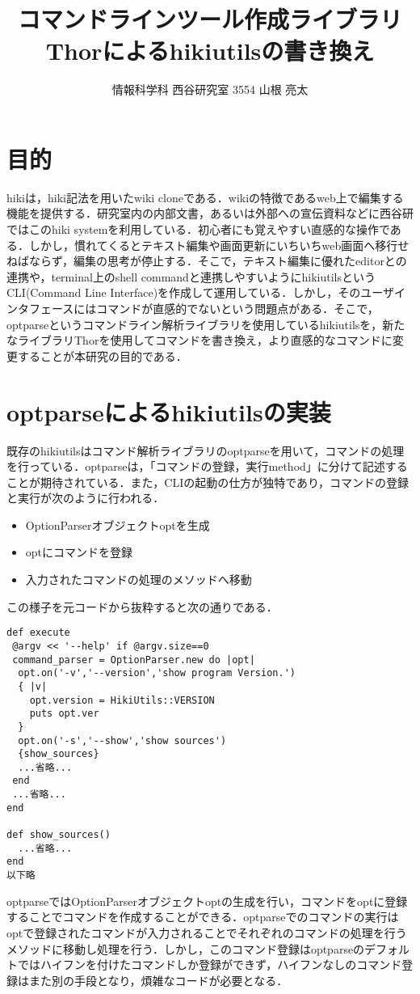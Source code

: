 \documentclass[a4j,twocolumn]{jsarticle}
\begin{document}
\title{コマンドラインツール作成ライブラリThorによるhikiutilsの書き換え}
\author{情報科学科 西谷研究室 3554 山根 亮太}
\date{}
\maketitle
\section{目的}
hikiは，hiki記法を用いたwiki cloneである．wikiの特徴であるweb上で編集する機能を提供する．研究室内の内部文書，あるいは外部への宣伝資料などに西谷研ではこのhiki systemを利用している．初心者にも覚えやすい直感的な操作である．しかし，慣れてくるとテキスト編集や画面更新にいちいちweb画面へ移行せねばならず，編集の思考が停止する．そこで，テキスト編集に優れたeditorとの連携や，terminal上のshell commandと連携しやすいようにhikiutilsというCLI(Command Line Interface)を作成して運用している\cite{hikiutils}．しかし，そのユーザインタフェースにはコマンドが直感的でないという問題点がある．そこで，optparse\cite{optparse}というコマンドライン解析ライブラリを使用しているhikiutilsを，新たなライブラリThor\cite{thor}を使用してコマンドを書き換え，より直感的なコマンドに変更することが本研究の目的である．

\section{optparseによるhikiutilsの実装}
既存のhikiutilsはコマンド解析ライブラリのoptparseを用いて，コマンドの処理を行っている．optparseは，「コマンドの登録，実行method」に分けて記述することが期待されている．また，CLIの起動の仕方が独特であり，コマンドの登録と実行が次のように行われる．
\begin{itemize}
\item OptionParserオブジェクトoptを生成
\item optにコマンドを登録
\item 入力されたコマンドの処理のメソッドへ移動
\end{itemize}

この様子を元コードから抜粋すると次の通りである．

\begin{lstlisting}[style=customRuby,basicstyle={\scriptsize\ttfamily}]
def execute
 @argv << '--help' if @argv.size==0
 command_parser = OptionParser.new do |opt|
  opt.on('-v','--version','show program Version.') 
  { |v|
    opt.version = HikiUtils::VERSION
    puts opt.ver
  }
  opt.on('-s','--show','show sources')
  {show_sources}                
  ...省略...
 end
 ...省略...
end     
  
def show_sources()
  ...省略...
end
以下略
\end{lstlisting}
optparseではOptionParserオブジェクトoptの生成を行い，コマンドをoptに登録することでコマンドを作成することができる．optparseでのコマンドの実行はoptで登録されたコマンドが入力されることでそれぞれのコマンドの処理を行うメソッドに移動し処理を行う．しかし，このコマンド登録はoptparseのデフォルトではハイフンを付けたコマンドしか登録ができず，ハイフンなしのコマンド登録はまた別の手段となり，煩雑なコードが必要となる．
\end{document}
